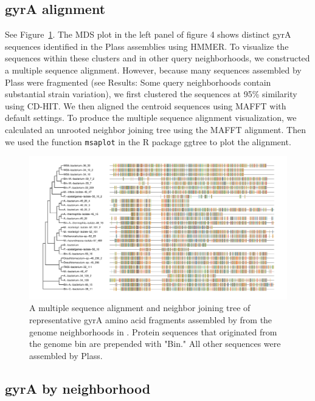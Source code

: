 \subsection{gyrA alignment}
\label{subsec:gyrAalign}

See Figure~\ref{fig:gyrAalign}. The MDS plot in the left panel of figure 4 shows
distinct gyrA sequences identified in the Plass assemblies using HMMER. To visualize
the sequences within these clusters and in other query neighborhoods, we
constructed a multiple sequence alignment. However, because many
sequences assembled by Plass were fragmented (see Results: Some query neighborhoods
contain substantial strain variation), we first clustered the sequences at 95\%
similarity using CD-HIT. We then aligned the centroid sequences using MAFFT with
default settings. To produce the multiple sequence alignment visualization, we
calculated an unrooted neighbor joining tree using the MAFFT alignment. Then we used
the function {\tt msaplot} in the R package ggtree to plot the alignment.

\begin{figure}
 \centering
 \includegraphics[width=\linewidth]{figures/gyrA-cdhit95-msa}
	\caption{A multiple sequence alignment and neighbor joining tree of representative gyrA amino acid fragments assembled by \plass from the genome neighborhoods in \hu. Protein sequences that originated from the genome bin are prepended with "Bin." All other sequences were assembled by Plass.
 }
 \label{fig:gyrAalign}
\end{figure}

\subsection{gyrA by neighborhood}
\label{subsec:gyrAnbhd}

